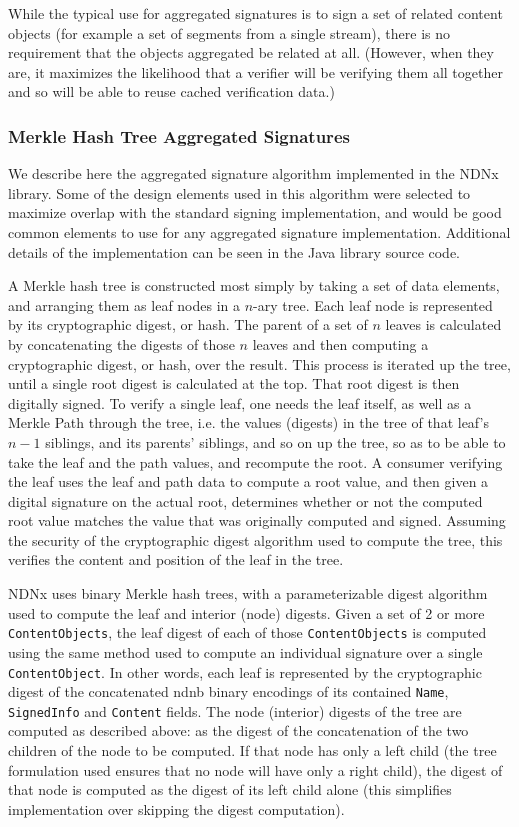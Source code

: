 While the typical use for aggregated signatures is to sign a set of
related content objects (for example a set of segments from a single
stream), there is no requirement that the objects aggregated be
related at all. (However, when they are, it maximizes the likelihood
that a verifier will be verifying them all together and so will be
able to reuse cached verification data.)


\subsubsection{Merkle Hash Tree Aggregated Signatures}

We describe here the aggregated signature algorithm implemented in the
NDNx library. Some of the design elements used in this algorithm were
selected to maximize overlap with the standard signing implementation,
and would be good common elements to use for any aggregated signature
implementation. Additional details of the implementation can be seen
in the Java library source code.

A Merkle hash tree is constructed most simply by taking a set of data
elements, and arranging them as leaf nodes in a $n$-ary tree. Each
leaf node is represented by its cryptographic digest, or hash. The
parent of a set of $n$ leaves is calculated by concatenating the
digests of those $n$ leaves and then computing a cryptographic digest,
or hash, over the result. This process is iterated up the tree, until
a single root digest is calculated at the top. That root digest is
then digitally signed. To verify a single leaf, one needs the leaf
itself, as well as a Merkle Path through the tree, i.e. the values
(digests) in the tree of that leaf's $n-1$ siblings, and its parents'
siblings, and so on up the tree, so as to be able to take the leaf and
the path values, and recompute the root. A consumer verifying the leaf
uses the leaf and path data to compute a root value, and then given a
digital signature on the actual root, determines whether or not the
computed root value matches the value that was originally computed and
signed. Assuming the security of the cryptographic digest algorithm
used to compute the tree, this verifies the content and position of
the leaf in the tree.

NDNx uses binary Merkle hash trees, with a parameterizable digest
algorithm used to compute the leaf and interior (node) digests. Given
a set of 2 or more {\tt ContentObjects}, the leaf digest of each of
those {\tt ContentObjects} is computed using the same method used to
compute an individual signature over a single {\tt ContentObject}. In
other words, each leaf is represented by the cryptographic digest of
the concatenated ndnb binary encodings of its contained {\tt Name},
{\tt SignedInfo} and {\tt Content} fields. The node (interior) digests
of the tree are computed as described above: as the digest of the
concatenation of the two children of the node to be computed. If that
node has only a left child (the tree formulation used ensures that no
node will have only a right child), the digest of that node is
computed as the digest of its left child alone (this simplifies
implementation over skipping the digest computation).

